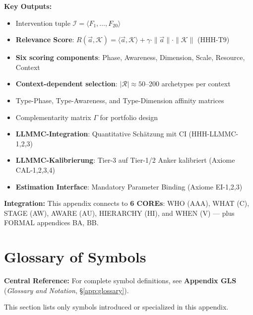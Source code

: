 \begin{tcolorbox}[colback=green!10!white, colframe=green!75!black,
    title=\textbf{Appendix HHH: Summary}]
\textbf{Key Outputs:}
\begin{itemize}[nosep]
    \item Intervention tuple $\mathcal{I} = \langle F_1, \ldots, F_{20} \rangle$
    \item \textbf{Relevance Score}: $R(\vec{a}, \mathcal{K}) = \langle \vec{a}, \mathcal{K} \rangle + \gamma \cdot \|\vec{a}\| \cdot \|\mathcal{K}\|$ (HHH-T9)
    \item \textbf{Six scoring components}: Phase, Awareness, Dimension, Scale, Resource, Context
    \item \textbf{Context-dependent selection}: $|\mathcal{R}| \approx 50$--200 archetypes per context
    \item Type-Phase, Type-Awareness, and Type-Dimension affinity matrices
    \item Complementarity matrix $\Gamma$ for portfolio design
    \item \textbf{LLMMC-Integration}: Quantitative Schätzung mit CI (HHH-LLMMC-1,2,3)
    \item \textbf{LLMMC-Kalibrierung}: Tier-3 auf Tier-1/2 Anker kalibriert (Axiome CAL-1,2,3,4)
    \item \textbf{Estimation Interface}: Mandatory Parameter Binding (Axiome EI-1,2,3)
\end{itemize}

\textbf{Integration:} This appendix connects to \textbf{6 COREs}: WHO (AAA), WHAT (C), STAGE (AW), AWARE (AU), HIERARCHY (HI), and WHEN (V) --- plus FORMAL appendices BA, BB.

\end{tcolorbox}


\section{Glossary of Symbols}
\label{sec:hhh-glossary}

\begin{tcolorbox}[colback=blue!5!white, colframe=blue!75!black]
\textbf{Central Reference:} For complete symbol definitions, see
\textbf{Appendix GLS} (\textit{Glossary and Notation}, \S\ref{app:glossary}).

This section lists only symbols introduced or specialized in this appendix.
\end{tcolorbox}

\vspace{0.5em}

